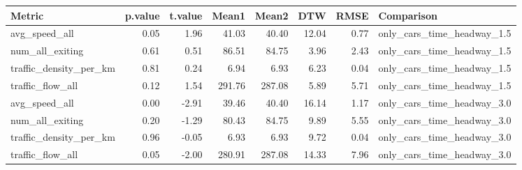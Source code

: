 \begin{table}[ht]
\centering
\begin{tabular}{lrrrrrrl}
  \hline
Metric & p.value & t.value & Mean1 & Mean2 & DTW & RMSE & Comparison \\
  \hline
avg\_speed\_all & 0.05 & 1.96 & 41.03 & 40.40 & 12.04 & 0.77 & only\_cars\_time\_headway\_1.5 \\
  num\_all\_exiting & 0.61 & 0.51 & 86.51 & 84.75 & 3.96 & 2.43 & only\_cars\_time\_headway\_1.5 \\
  traffic\_density\_per\_km & 0.81 & 0.24 & 6.94 & 6.93 & 6.23 & 0.04 & only\_cars\_time\_headway\_1.5 \\
  traffic\_flow\_all & 0.12 & 1.54 & 291.76 & 287.08 & 5.89 & 5.71 & only\_cars\_time\_headway\_1.5 \\
  avg\_speed\_all & 0.00 & -2.91 & 39.46 & 40.40 & 16.14 & 1.17 & only\_cars\_time\_headway\_3.0 \\
  num\_all\_exiting & 0.20 & -1.29 & 80.43 & 84.75 & 9.89 & 5.55 & only\_cars\_time\_headway\_3.0 \\
  traffic\_density\_per\_km & 0.96 & -0.05 & 6.93 & 6.93 & 9.72 & 0.04 & only\_cars\_time\_headway\_3.0 \\
  traffic\_flow\_all & 0.05 & -2.00 & 280.91 & 287.08 & 14.33 & 7.96 & only\_cars\_time\_headway\_3.0 \\
   \hline
\end{tabular}
\end{table}
